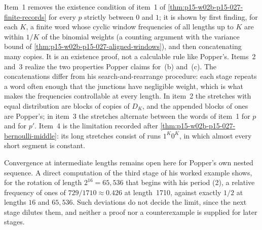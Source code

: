 Item~1 removes the existence condition of item~1 of
\cref{thm:p15-w02b-p15-027-finite-records} for every \(p\) strictly
between \(0\) and \(1\); it is shown by first finding, for each \(K\), a
finite word whose cyclic window frequencies of all lengths up to \(K\)
are within \(1/K\) of the binomial weights (a counting argument with the
variance bound of \cref{thm:p15-w02b-p15-027-aligned-windows}), and then
concatenating many copies. It is an existence proof, not a calculable
rule like Popper's. Items~2 and~3 realize the two properties Popper
claims for~(b) and~(c). The concatenations differ from his
search-and-rearrange procedure: each stage repeats a word often enough
that the junctions have negligible weight, which is what makes the
frequencies controllable at every length. In item~2 the stretches with
equal distribution are blocks of copies of \(D_K\), and the appended
blocks of ones are Popper's; in item~3 the stretches alternate between
the words of item~1 for \(p\) and for \(p'\). Item~4 is the limitation
recorded after \cref{thm:p15-w02b-p15-027-bernoulli-middle}: its long
stretches consist of runs \(1^K0^K\), in which almost every short
segment is constant.

Convergence at intermediate lengths remains open here for Popper's
own nested sequence. A direct computation of the third stage of
his worked example shows, for the rotation of length
\(2^{16}=65{,}536\) that begins with his period (2),  a relative frequency of ones of
\(729/1710\approx0.426\) at length~1710, against exactly \(1/2\) at
lengths \(16\) and \(65{,}536\). Such deviations do not decide the limit,
since the next stage dilutes them, and neither a proof nor a
counterexample is supplied for later stages.

